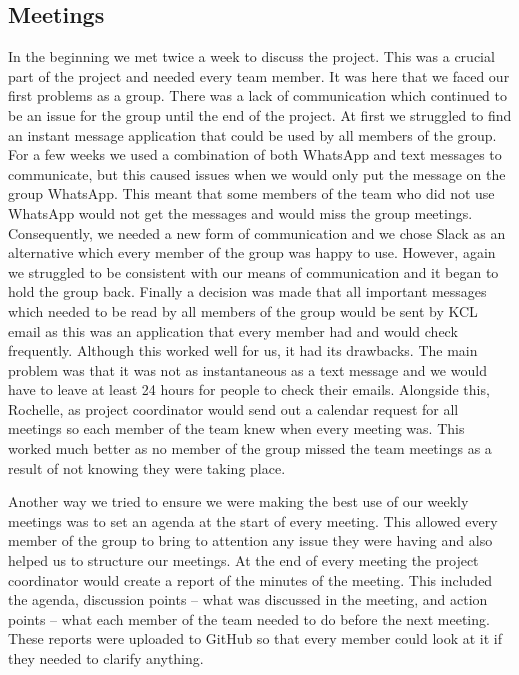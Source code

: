 \documentclass{article}
\begin{document}
	\subsection{Meetings}
	In the beginning we met twice a week to discuss the project. 
	This was a crucial part of the project and needed every team member. 
	It was here that we faced our first problems as a group. 
	There was a lack of communication which continued to be an issue for the group until the end of the project. 
	At first we struggled to find an instant message application that could be used by all members of the group. 
	For a few weeks we used a combination of both WhatsApp and text messages to communicate, but this caused issues when we would only put the message on the group WhatsApp. 
	This meant that some members of the team who did not use WhatsApp would not get the messages and would miss the group meetings. 
	Consequently, we needed a new form of communication and we chose Slack as an alternative which every member of the group was happy to use. 
	However, again we struggled to be consistent with our means of communication and it began to hold the group back. 
	Finally a decision was made that all important messages which needed to be read by all members of the group would be sent by KCL email as this was an application that every member had and would check frequently. 
	Although this worked well for us, it had its drawbacks. 
	The main problem was that it was not as instantaneous as a text message and we would have to leave at least 24 hours for people to check their emails. 
	Alongside this, Rochelle, as project coordinator would send out a calendar request for all meetings so each member of the team knew when every meeting was. 
	This worked much better as no member of the group missed the team meetings as a result of not knowing they were taking place. 
	
	Another way we tried to ensure we were making the best use of our weekly meetings was to set an agenda at the start of every meeting. 
	This allowed every member of the group to bring to attention any issue they were having and also helped us to structure our meetings. 
	At the end of every meeting the project coordinator would create a report of the minutes of the meeting. This included the agenda, discussion points -- what was discussed in the meeting, and action points -- what each member of the team needed to do before the next meeting. 
	These reports were uploaded to GitHub so that every member could look at it if they needed to clarify anything.
	
\end{document}
